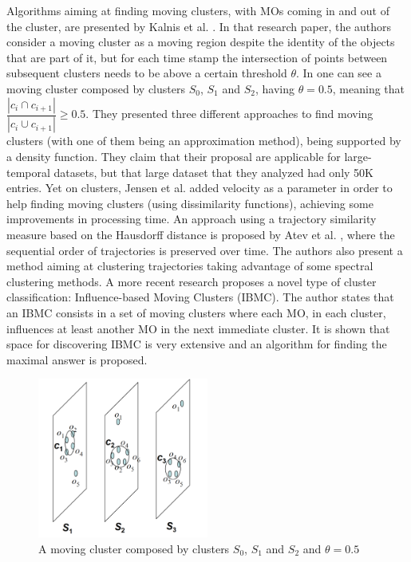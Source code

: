 Algorithms aiming at finding moving clusters, with MOs coming in and out of the cluster, are presented by Kalnis et al.
\citep{movingclusters}. In that research paper, the authors consider a moving cluster as a moving region despite the
identity of the objects that are part of it, but for each time stamp the intersection of points between subsequent
clusters needs to be above a certain threshold $\theta$. In  one can see a moving cluster composed
by clusters $S_0$, $S_1$ and $S_2$, having $\theta=0.5$, meaning that $\dfrac{|c_i \cap c_{i+1}|}{|c_i \cup c_{i+1}|}
\geq 0.5$. They presented three different approaches to find moving clusters (with one of them being an approximation
method), being supported by a density function. They claim that their proposal are applicable for large-temporal
datasets, but that large dataset that they analyzed had only 50K entries. Yet on clusters, Jensen et al.
\citep{clusters3} added velocity as a parameter in order to help finding moving clusters (using dissimilarity
functions), achieving some improvements in processing time. An approach using a trajectory similarity measure based on
the Hausdorff distance is proposed by Atev et al. \citep{clusters2}, where the sequential order of trajectories is
preserved over time. The authors also present a method aiming at clustering trajectories taking advantage of some
spectral clustering methods. A more recent research \citep{clusters1} proposes a novel type of cluster classification:
Influence-based Moving Clusters (IBMC). The author states that an IBMC consists in a set of moving clusters where each
MO, in each cluster, influences at least another MO in the next immediate cluster. It is shown that space for
discovering IBMC is very extensive and an algorithm for finding the maximal answer is proposed.

\begin{figure}
    \centering
    \includegraphics[width=0.5\textwidth]{images/clusters.png}
    \caption{A moving cluster composed by clusters $S_0$, $S_1$ and $S_2$ and $\theta=0.5$ \citep{movingclusters}}
    \label{fig:clusters}
\end{figure}

